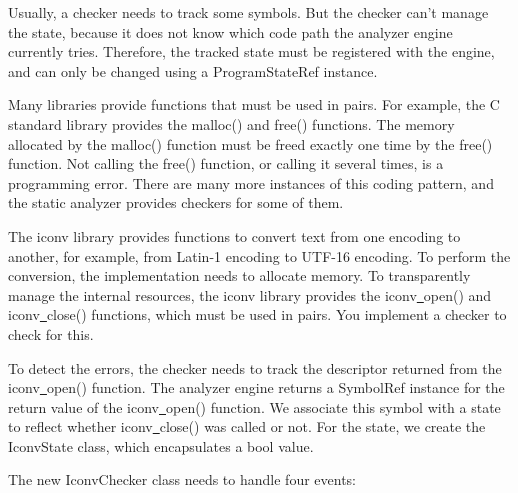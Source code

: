 Usually, a checker needs to track some symbols. But the checker can't manage the state, because it does not know which code path the analyzer engine currently tries. Therefore, the tracked state must be registered with the engine, and can only be changed using a ProgramStateRef instance.\par

Many libraries provide functions that must be used in pairs. For example, the C standard library provides the malloc() and free() functions. The memory allocated by the malloc() function must be freed exactly one time by the free() function. Not calling the free() function, or calling it several times, is a programming error. There are many more instances of this coding pattern, and the static analyzer provides checkers for some of them.\par

The iconv library provides functions to convert text from one encoding to another, for example, from Latin-1 encoding to UTF-16 encoding. To perform the conversion, the implementation needs to allocate memory. To transparently manage the internal resources, the iconv library provides the iconv\underline{~}open() and iconv\underline{~}close() functions, which must be used in pairs. You implement a checker to check for this.\par

To detect the errors, the checker needs to track the descriptor returned from the iconv\underline{~}open() function. The analyzer engine returns a SymbolRef instance for the return value of the iconv\underline{~}open() function. We associate this symbol with a state to reflect whether iconv\underline{~}close() was called or not. For the state, we create the IconvState class, which encapsulates a bool value.\par

The new IconvChecker class needs to handle four events:\par

